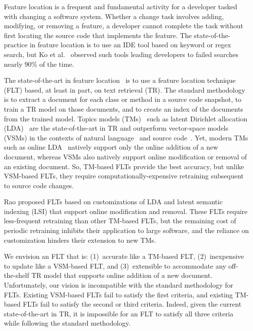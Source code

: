 
Feature location is a frequent and fundamental activity for a developer tasked with changing a software system.
Whether a change task involves adding, modifying, or removing a feature, a developer cannot complete the task without first locating the source code that implements the feature.
The state-of-the-practice in feature location is to use an IDE tool based on keyword or regex search, but Ko et al.~\cite{Ko-etal:2006} observed such tools leading developers to failed searches nearly 90\% of the time.

The state-of-the-art in feature location~\cite{Dit-etal:2011} is to use a feature location technique (FLT) based, at least in part, on text retrieval (TR).
The standard methodology~\cite{Marcus-etal:2004} is to extract a document for each class or method in a source code snapshot, to train a TR model on those documents, and to create an index of the documents from the trained model.
Topics models (TMs)~\cite{Blei:2012} such as latent Dirichlet allocation (LDA)~\cite{Blei-etal:2003} are the state-of-the-art in TR and outperform vector-space models (VSMs) in the contexts of natural language~\cite{Deerwester-etal:1990,Blei-etal:2003} and source code~\cite{Poshyvanyk-etal:2007,Lukins-etal:2010}.
Yet, modern TMs such as online LDA~\cite{Hoffman-etal:2010} natively support only the online addition of a new document, whereas VSMs also natively support online modification or removal of an existing document.
So, TM-based FLTs provide the best accuracy, but unlike VSM-based FLTs, they require computationally-expensive retraining subsequent to source code changes.

Rao\cite{Rao:2013} proposed FLTs based on customizations of LDA and latent semantic indexing (LSI) that support online modification and removal.
These FLTs require less-frequent retraining than other TM-based FLTs,
but the remaining cost of periodic retraining inhibits their application to large software, and the reliance on customization hinders their extension to new TMs.

We envision an FLT that is: (1)~accurate like a TM-based FLT, (2)~inexpensive to update like a VSM-based FLT, and (3)~extensible to accommodate any off-the-shelf TR model that supports online addition of a new document.
Unfortunately, our vision is incompatible with the standard methodology for FLTs.
Existing VSM-based FLTs fail to satisfy the first criteria, and existing TM-based FLTs fail to satisfy the second or third criteria.
Indeed, given the current state-of-the-art in TR, it is impossible for an FLT to satisfy all three criteria while following the standard methodology.


